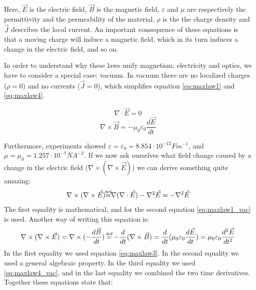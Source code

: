 Here, $\vec{E}$ is the electric field, $\vec{B}$ is the magnetic field, $\varepsilon$ and $\mu$ are respectively the permittivity and the permeability of the material. $\rho$ is the the charge density and $\vec{J}$ describes the local current. %
An important consequence of these equations is that a moving charge will induce a magnetic field, which in its turn induces a change in the electric field, and so on.

In order to understand why these laws unify magnetism, electricity and optics, we have to consider a special case: vacuum. In vacuum there are no localized charges ($\rho = 0$) and no currents ($\vec{J}=0$), which simplifies equation \ref{eq:maxlaw1} and \ref{eq:maxlaw4}. 

\begin{equation} \nabla \cdot   \vec{E} = 0 \label{eq:maxlaw1_vac}\end{equation}
\begin{equation} \nabla \times \vec{B} = -\mu_0\varepsilon_0\frac{d\vec{E}}{dt}\label{eq:maxlaw4_vac}\end{equation}

Furthermore, experiments showed $\varepsilon = \varepsilon_0 = 8.854\cdot10^{-12} Fm^{-1}$, and $\mu = \mu_0 = 1.257 \cdot 10^{-7} N A^{-2}$. If we now ask ourselves what field change caused by a change in the electric field ($\nabla \times( \nabla \times \vec{E}) $) we can derive something quite amazing:  
\[ \nabla \times( \nabla \times \vec{E}) { \isdef}\nabla (\nabla \cdot
\vec{E}) -\nabla^2 \vec{E} =-\nabla^2 \vec{E} \]
The first equality is mathematical, and for the second equation \ref{eq:maxlaw1_vac} is used. Another way of writing this equation is:
\[\nabla \times( \nabla \times \vec{E})=
\nabla\times(-\frac{d\vec{B}}{dt}) \isdef
-\frac{d}{dt}(\nabla\times\vec{B})=\frac{d}{dt}(\mu_0\varepsilon_0\frac{d\vec{E}}{dt})
= \mu_0\varepsilon_0\frac{d^2\vec{E}}{dt^2}\]
In the first equality we used equation \ref{eq:maxlaw3}. In the second equality we used a general algebraic property. In the third equality we used \ref{eq:maxlaw4_vac}, and in the last equality we combined the two time derivatives. Together these equations state that:

